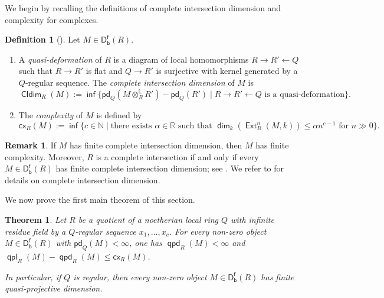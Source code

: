 \documentclass[10pt, a4paper,reqno]{amsart}
\newtheorem{thm}{Theorem}[section]
\theoremstyle{definition}
\newtheorem{dfn}[dfn]{Definition}
\newtheorem{rmk}[rmk]{Remark}
\theoremstyle{remark}
\numberwithin{equation}{thm}
\def\NN{\mathbb{N}}
\def\RR{\mathbb{R}}
\def\dim{\operatorname{\mathsf{dim}}}
\def\Ext{\operatorname{\mathsf{Ext}}}
\def\Dfb{\mathsf{D^f_b}}
\def\ltensor{\otimes^{\mathbb{L}}}
\def\inf{\operatorname{\mathsf{inf}}}
\def\cx{\mathsf{cx}}
\def\CIdim{\operatorname{\mathsf{CIdim}}}
\def\pd{\mathsf{pd}}
\def\qpd{\operatorname{\mathsf{qpd}}}
\def\qpl{\operatorname{\mathsf{qpl}}}
\begin{document}
We begin by recalling the definitions of complete intersection dimension and complexity for complexes.

\begin{dfn}[{\cite{AGP,SW}}]
Let $M \in \Dfb(R)$.
\begin{enumerate}[\rm(1)]
\item	
A {\em quasi-deformation} of $R$ is a diagram of local homomorphisms $R \to R' \gets Q$ such that $R \to R'$ is flat and $Q \to R'$ is surjective with kernel generated by a $Q$-regular sequence.
The {\em complete intersection dimension} of $M$ is 
\[
\CIdim_R(M) := \inf\{\pd_Q(M \ltensor_R R') - \pd_Q(R') \mid \mbox{$R \to R' \gets Q$ is a quasi-deformation}\}.
\]
\item
The {\em complexity} of $M$ is defined by
\[
\cx_R(M) := \inf\{c \in \NN \mid \mbox{there exists $\alpha \in \RR$ such that $\dim_k(\Ext_R^n(M,k)) \le \alpha n^{c-1}$ for $n \gg 0$}\}.
\]
\end{enumerate}
\end{dfn} 


\begin{rmk}
If $M$ has finite complete intersection dimension, then $M$ has finite complexity.
Moreover, $R$ is a complete intersection if and only if every $M\in\Dfb(R)$ has finite complete intersection dimension; see \cite[Proposition~3.5]{SW}.
We refer to \cite{AGP, SW} for details on complete intersection dimension.
\end{rmk}


We now prove the first main theorem of this section.

\begin{thm}\label{cxbound}
Let $R$ be a quotient of a noetherian local ring $Q$ with infinite residue field by a $Q$-regular sequence $x_1,\ldots,x_c$. 
For every non-zero object $M \in \Dfb(R)$ with $\pd_Q(M) < \infty$, one has $\qpd_R(M) < \infty$ and $\qpl_R(M) -\qpd_R(M) \le \cx_R(M)$.

In particular, if $Q$ is regular, then every non-zero object $M \in \Dfb(R)$ has finite quasi-projective dimension.
\end{thm}
\end{document}

